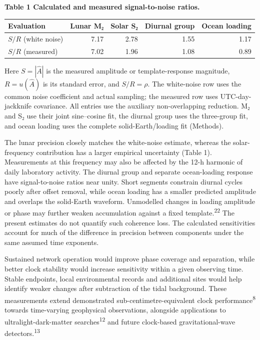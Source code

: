 \documentclass[
  11pt,
  a4paper,
]{article}
\begin{document}
\par\noindent\begin{minipage}[t]{\linewidth}\vspace{0pt}\singlespacing\small\nolinenumbers

\textbf{Table 1 \textbar{} Calculated and measured signal-to-noise
ratios.}

\begin{longtable}[]{@{}lrrrr@{}}
\toprule\noalign{}
Evaluation & Lunar M₂ & Solar S₂ & Diurnal group & Ocean loading \\
\midrule\noalign{}
\endhead
\bottomrule\noalign{}
\endlastfoot
\(S/R\) (white noise) & 7.17 & 2.78 & 1.55 & 1.17 \\
\(S/R\) (measured) & 7.02 & 1.96 & 1.08 & 0.89 \\
\end{longtable}

Here \(S=|\hat A|\) is the measured amplitude or template-response
magnitude, \(R=u(\hat A)\) is its standard error, and \(S/R=\rho\). The
white-noise row uses the common noise coefficient and actual sampling;
the measured row uses UTC-day-jackknife covariance. All entries use the
auxiliary non-overlapping reduction. M₂ and S₂ use their joint
sine--cosine fit, the diurnal group uses the three-group fit, and ocean
loading uses the complete solid-Earth/loading fit (Methods).

\end{minipage}\par

The lunar precision closely matches the white-noise estimate, whereas
the solar-frequency contribution has a larger empirical uncertainty
(Table 1). Measurements at this frequency may also be affected by the
12-h harmonic of daily laboratory activity. The diurnal group and
separate ocean-loading response have signal-to-noise ratios near unity.
Short segments constrain diurnal cycles poorly after offset removal,
while ocean loading has a smaller predicted amplitude and overlaps the
solid-Earth waveform. Unmodelled changes in loading amplitude or phase
may further weaken accumulation against a fixed
template.\textsuperscript{22} The present estimates do not quantify such
coherence loss. The calculated sensitivities account for much of the
difference in precision between components under the same assumed time
exponents.

Sustained network operation would improve phase coverage and separation,
while better clock stability would increase sensitivity within a given
observing time. Stable endpoints, local environmental records and
additional sites would help identify weaker changes after subtraction of
the tidal background. These measurements extend demonstrated
sub-centimetre-equivalent clock performance\textsuperscript{8} towards
time-varying geophysical observations, alongside applications to
ultralight-dark-matter searches\textsuperscript{12} and future
clock-based gravitational-wave detectors.\textsuperscript{13}
\end{document}

